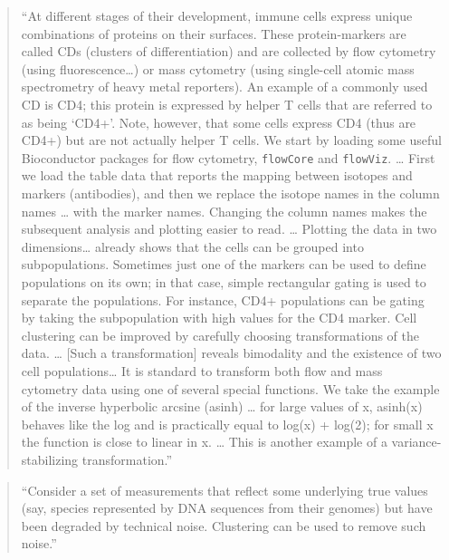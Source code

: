 \documentclass[]{tufte-book}
\begin{document}
\begin{quote}
``At different stages of their development, immune cells express unique
combinations of proteins on their surfaces. These protein-markers are called
CDs (clusters of differentiation) and are collected by flow cytometry
(using fluorescence\ldots) or mass cytometry (using single-cell atomic mass
spectrometry of heavy metal reporters). An example of a commonly used CD is
CD4; this protein is expressed by helper T cells that are referred to as
being `CD4+'. Note, however, that some cells express CD4 (thus are CD4+)
but are not actually helper T cells. We start by loading some useful Bioconductor
packages for flow cytometry, \texttt{flowCore} and \texttt{flowViz}. \ldots{}
First we load the table data that reports the mapping between isotopes and
markers (antibodies), and then we replace the isotope names in the column
names \ldots{} with the marker names. Changing the column names makes the subsequent
analysis and plotting easier to read. \ldots{} Plotting the data in two dimensions\ldots{}
already shows that the cells can be grouped into subpopulations. Sometimes just
one of the markers can be used to define populations on its own; in that case,
simple rectangular gating is used to separate the populations. For instance,
CD4+ populations can be gating by taking the subpopulation with high values
for the CD4 marker. Cell clustering can be improved by carefully choosing
transformations of the data. \ldots{} {[}Such a transformation{]} reveals
bimodality and the existence of two cell populations\ldots{} It is standard
to transform both flow and mass cytometry data using one of several special
functions. We take the example of the inverse hyperbolic arcsine (asinh) \ldots{}
for large values of x, asinh(x) behaves like the log and is practically
equal to log(x) + log(2); for small x the function is close to linear in
x. \ldots{} This is another example of a variance-stabilizing transformation.'' \citep{holmes2018modern}
\end{quote}

\begin{quote}
``Consider a set of measurements that reflect some underlying true values
(say, species represented by DNA sequences from their genomes) but
have been degraded by technical noise. Clustering can be used to remove
such noise.'' \citep{holmes2018modern}
\end{quote}
\end{document}
